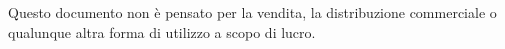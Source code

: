 \documentclass[a4paper,12pt]{report}
\theoremstyle{definition}
\begin{document}
Questo documento non è pensato per la vendita, la distribuzione commerciale o qualunque altra forma di utilizzo a scopo di lucro.

\tableofcontents


























\end{document}

